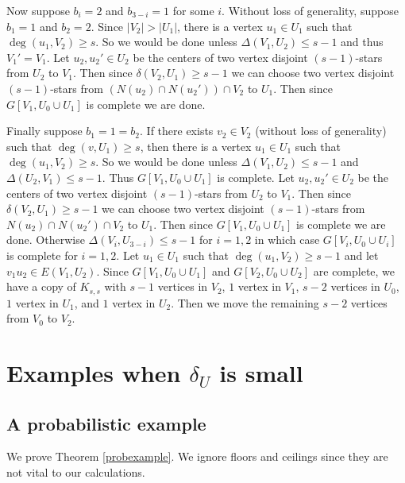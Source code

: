 \documentclass[oneside,12pt]{memoir}
\begin{document}
Now suppose $b_i=2$ and $b_{3-i}=1$ for some $i$.  Without loss of generality, suppose $b_1=1$ and $b_2=2$.  Since $|V_2|>|U_1|$, there is a vertex $u_1\in U_1$ such that $\deg(u_1, V_2)\geq s$.  So we would be done unless $\Delta(V_1, U_2)\leq s-1$ and thus $V_1'=V_1$.  Let $u_2, u_2'\in U_2$ be the centers of two vertex disjoint $(s-1)$-stars from $U_2$ to $V_1$.  Then since $\delta(V_2, U_1)\geq s-1$ we can choose two vertex disjoint $(s-1)$-stars from $(N(u_2)\cap N(u_2'))\cap V_2$ to $U_1$.  Then since $G[V_1, U_0\cup U_1]$ is complete we are done.

Finally suppose $b_1=1=b_2$.  If there exists $v_2\in V_2$ (without loss of generality) such that $\deg(v, U_1)\geq s$, then there is a vertex $u_1\in U_1$ such that $\deg(u_1, V_2)\geq s$.  So we would be done unless $\Delta(V_1, U_2)\leq s-1$ and $\Delta(U_2, V_1)\leq s-1$.  Thus $G[V_1, U_0\cup U_1]$ is complete.  Let $u_2, u_2'\in U_2$ be the centers of two vertex disjoint $(s-1)$-stars from $U_2$ to $V_1$.  Then since $\delta(V_2, U_1)\geq s-1$ we can choose two vertex disjoint $(s-1)$-stars from $N(u_2)\cap N(u_2')\cap V_2$ to $U_1$.  Then since $G[V_1, U_0\cup U_1]$ is complete we are done.  Otherwise $\Delta(V_i, U_{3-i})\leq s-1$ for $i=1,2$ in which case $G[V_i, U_0\cup U_i]$ is complete for $i=1,2$.  Let $u_1\in U_1$ such that $\deg(u_1, V_2)\geq s-1$ and let $v_1u_2\in E(V_1, U_2)$.  Since $G[V_1, U_0\cup U_1]$ and $G[V_2, U_0\cup U_2]$ are complete, we have a copy of $K_{s,s}$ with $s-1$ vertices in $V_2$, $1$ vertex in $V_1$, $s-2$ vertices in $U_0$, $1$ vertex in $U_1$, and $1$ vertex in $U_2$.  Then we move the remaining $s-2$ vertices from $V_0$ to $V_2$.



\section{Examples when $\delta_U$ is small}


\subsection{A probabilistic example}

We prove Theorem \ref{probexample}.  We ignore floors and ceilings since they are not vital to our calculations.
\end{document}
